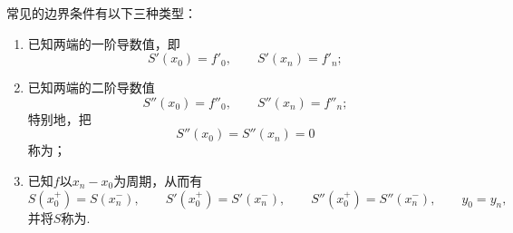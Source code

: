 常见的边界条件有以下三种类型：\begin{enumerate}
	\item 已知两端的一阶导数值，即\begin{equation*}
		S'(x_0) = f'_0,
		\qquad
		S'(x_n) = f'_n;
	\end{equation*}

	\item 已知两端的二阶导数值\begin{equation*}
		S''(x_0) = f''_0,
		\qquad
		S''(x_n) = f''_n;
	\end{equation*}
	特别地，把\begin{equation*}
		S''(x_0) = S''(x_n) = 0
	\end{equation*}
	称为；

	\item 已知\(f\)以\(x_n-x_0\)为周期，从而有\begin{equation*}
		S(x_0^+) = S(x_n^-),
		\qquad
		S'(x_0^+) = S'(x_n^-),
		\qquad
		S''(x_0^+) = S''(x_n^-),
		\qquad
		y_0 = y_n,
	\end{equation*}
	并将\(S\)称为.
\end{enumerate}
